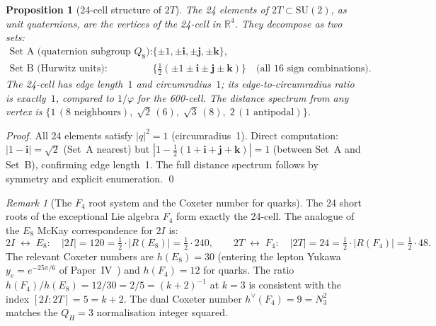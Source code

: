 \documentclass[11pt,a4paper]{article}
\newtheorem{proposition}[theorem]{Proposition}
\theoremstyle{definition}\newtheorem{definition}[theorem]{Definition}
\theoremstyle{remark}
\newtheorem{remark}[theorem]{Remark}
\newcommand{\vp}{\varphi}
\newcommand{\SU}{\mathrm{SU}}
\newcommand{\twoI}{2I}
\newcommand{\twoT}{2T}
\newcommand{\QH}{Q_H}
\begin{document}
\begin{proposition}[24-cell structure of $\twoT$]
\label{P15:prop:24cell}
The 24 elements of $\twoT\subset\SU(2)$, as unit quaternions,
are the vertices of the \emph{24-cell} in $\mathbb{R}^4$.
They decompose as two sets:
\begin{align}
  \text{Set A (quaternion subgroup }Q_8\text{):}&\quad
    \{\pm 1, \pm\mathbf{i}, \pm\mathbf{j}, \pm\mathbf{k}\},
  \label{P15:eq:Q8_vertices}\\
  \text{Set B (Hurwitz units):}&\quad
    \bigl\{\tfrac12(\pm1\pm\mathbf{i}\pm\mathbf{j}\pm\mathbf{k})\bigr\}
    \quad\text{(all 16 sign combinations).}
  \label{P15:eq:Hurwitz_vertices}
\end{align}
The 24-cell has edge length~$1$ and circumradius~$1$; its
\emph{edge-to-circumradius ratio is exactly~$1$},
compared to $1/\vp$ for the 600-cell.
The distance spectrum from any vertex is
$\{1\,(8\text{ neighbours}),\;\sqrt{2}\,(6),\;\sqrt{3}\,(8),\;2\,(1\text{ antipodal})\}$.
\end{proposition}

\begin{proof}
All 24 elements satisfy $|q|^2=1$ (circumradius~1).
Direct computation: $|1-\mathbf{i}|=\sqrt{2}$ (Set~A nearest)
but $|1-\tfrac12(1+\mathbf{i}+\mathbf{j}+\mathbf{k})|=1$ (between Set~A and Set~B),
confirming edge length~1.
The full distance spectrum follows by symmetry and explicit enumeration.
\qed
\end{proof}

\begin{remark}[The $F_4$ root system and the Coxeter number for quarks]
\label{P15:rem:F4}
The 24 short roots of the exceptional Lie algebra $F_4$ form exactly the
24-cell. The analogue of the $E_8$ McKay correspondence for $\twoI$ is:
\begin{equation}
  \twoI \;\leftrightarrow\; E_8:\quad
  |\twoI|=120 = \tfrac12\cdot|R(E_8)|=\tfrac12\cdot 240,
  \qquad
  \twoT \;\leftrightarrow\; F_4:\quad
  |\twoT|=24 = \tfrac12\cdot|R(F_4)|=\tfrac12\cdot 48.
  \label{P15:eq:2T_F4}
\end{equation}
The relevant Coxeter numbers are $h(E_8)=30$ (entering the lepton Yukawa
$y_e=e^{-25\pi/6}$ of Paper~IV~\cite{Paper4}) and $h(F_4)=12$ for quarks.
The ratio $h(F_4)/h(E_8)=12/30=2/5=(k+2)^{-1}$ at $k=3$ is consistent
with the index $[\twoI:\twoT]=5=k+2$.
The dual Coxeter number $h^\vee(F_4)=9=N_3^2$ matches the $\QH=3$
normalisation integer squared.
\end{remark}
\end{document}
